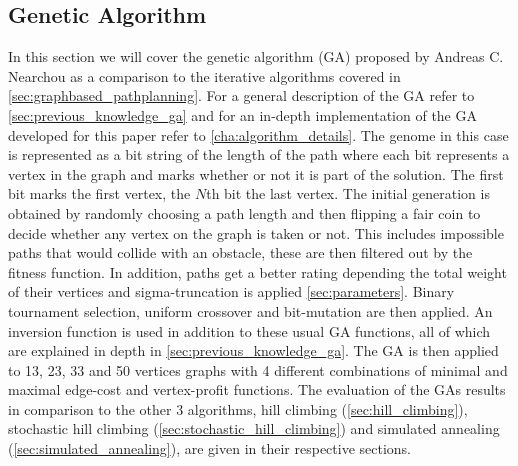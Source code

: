 

\subsection{Genetic Algorithm}
\label{sec:other_genetic_algorithm}

In this section we will cover the genetic algorithm (GA) proposed by Andreas C. Nearchou \cite{8} as a comparison to the iterative algorithms covered in \ref{sec:graphbased_pathplanning}. For a general description of the GA refer to \ref{sec:previous_knowledge_ga} and for an in-depth implementation of the GA developed for this paper refer to \ref{cha:algorithm_details}.
The genome in this case is represented as a bit string of the length of the path where each bit represents a vertex in the graph and marks whether or not it is part of the solution. The first bit marks the first vertex, the $N$th bit the last vertex. The initial generation is obtained by randomly choosing a path length and then flipping a fair coin to decide whether any vertex on the graph is taken or not. This includes impossible paths that would collide with an obstacle, these are then filtered out by the fitness function. In addition, paths get a better rating depending the total weight of their vertices and sigma-truncation is applied \ref{sec:parameters}. Binary tournament selection, uniform crossover and bit-mutation are then applied. An inversion function is used in addition to these usual GA functions, all of which are explained in depth in \ref{sec:previous_knowledge_ga}.
The GA is then applied to 13, 23, 33 and 50 vertices graphs with 4 different combinations of minimal and maximal edge-cost and vertex-profit functions. The evaluation of the GAs results in comparison to the other 3 algorithms, hill climbing (\ref{sec:hill_climbing}), stochastic hill climbing (\ref{sec:stochastic_hill_climbing}) and simulated annealing (\ref{sec:simulated_annealing}), are given in their respective sections.